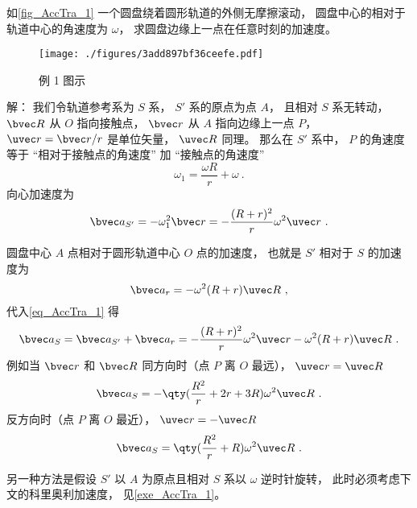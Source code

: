 \begin{example}{}\label{ex_AccTra_1}
如\autoref{fig_AccTra_1} 一个圆盘绕着圆形轨道的外侧无摩擦滚动， 圆盘中心的相对于轨道中心的角速度为 $\omega$， 求圆盘边缘上一点在任意时刻的加速度。
\begin{figure}[ht]
\centering
\texttt{[image: ./figures/3add897bf36ceefe.pdf]}
\caption{例 1 图示} \label{fig_AccTra_1}
\end{figure}

解： 我们令轨道参考系为 $S$ 系， $S'$ 系的原点为点 $A$， 且相对 $S$ 系无转动， $\bvec R$ 从 $O$ 指向接触点， $\bvec r$ 从 $A$ 指向边缘上一点 $P$， $\uvec r = \bvec r/r$ 是单位矢量， $\uvec R$ 同理。 那么在 $S'$ 系中， $P$ 的角速度等于 “相对于接触点的角速度” 加 “接触点的角速度”
\begin{equation}
\omega_1 = \frac{\omega R}{r} + \omega~.
\end{equation}
向心加速度为
\begin{equation}
\bvec a_{S'} = -\omega_1^2 \bvec r = -\frac{(R+r)^2}{r} \omega^2\uvec r~.
\end{equation}


圆盘中心 $A$ 点相对于圆形轨道中心 $O$ 点的加速度， 也就是 $S'$ 相对于 $S$ 的加速度为
\begin{equation}
\bvec a_r = -\omega^2 (R + r)\uvec R~,
\end{equation}
代入\autoref{eq_AccTra_1} 得
\begin{equation}
\bvec a_S = \bvec a_{S'} + \bvec a_r = -\frac{(R+r)^2}{r} \omega^2\uvec r -\omega^2 (R + r)\uvec R~.
\end{equation}
例如当 $\bvec r$ 和 $\bvec R$ 同方向时（点 $P$ 离 $O$ 最远）， $\uvec r = \uvec R$
\begin{equation}
\bvec a_S = -\qty(\frac{R^2}{r} + 2r + 3R)\omega^2 \uvec R~.
\end{equation}
反方向时（点 $P$ 离 $O$ 最近）， $\uvec r = -\uvec R$
\begin{equation}
\bvec a_S = \qty(\frac{R^2}{r} + R)\omega^2\uvec R~.
\end{equation}



另一种方法是假设 $S'$ 以 $A$ 为原点且相对 $S$ 系以 $\omega$ 逆时针旋转， 此时必须考虑下文的科里奥利加速度， 见\autoref{exe_AccTra_1}。
\end{example}

